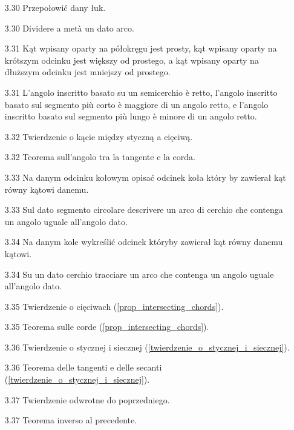 \begin{enumerate}
    \item [3.30] Przepołowić dany łuk. %
    \item [3.30] Dividere a metà un dato arco. %

    \item [3.31] Kąt wpisany oparty na półokręgu jest prosty, kąt wpisany oparty na krótszym odcinku jest większy od prostego, a kąt wpisany oparty na dłuższym odcinku jest mniejszy od prostego. %
    \item [3.31] L'angolo inscritto basato su un semicerchio è retto, l'angolo inscritto basato sul segmento più corto è maggiore di un angolo retto, e l'angolo inscritto basato sul segmento più lungo è minore di un angolo retto. %
    
    \item [3.32] Twierdzenie o kącie między styczną a cięciwą. %
    \item [3.32] Teorema sull'angolo tra la tangente e la corda. %
    
    \item [3.33] Na danym odcinku kołowym opisać odcinek koła który by zawierał kąt równy kątowi danemu. %
    \item [3.33] Sul dato segmento circolare descrivere un arco di cerchio che contenga un angolo uguale all'angolo dato. %
    
    \item [3.34] Na danym kole wykreślić odcinek któryby zawierał kąt równy danemu kątowi. %
    \item [3.34] Su un dato cerchio tracciare un arco che contenga un angolo uguale all'angolo dato. %
    
    \item [3.35] Twierdzenie o cięciwach (\ref{prop_intersecting_chords}). %
    \item [3.35] Teorema sulle corde (\ref{prop_intersecting_chords}). %
    
    \item [3.36] Twierdzenie o stycznej i siecznej (\ref{twierdzenie_o_stycznej_i_siecznej}). %
    \item [3.36] Teorema delle tangenti e delle secanti (\ref{twierdzenie_o_stycznej_i_siecznej}). %
    
    \item [3.37] Twierdzenie odwrotne do poprzedniego. %
    \item [3.37] Teorema inverso al precedente. %
\end{enumerate}

%